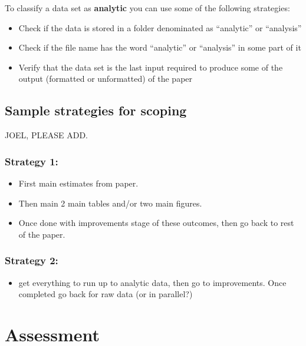\documentclass[]{book}
\providecommand{\tightlist}{%
  \setlength{\itemsep}{0pt}\setlength{\parskip}{0pt}}
\begin{document}
To classify a data set as \textbf{analytic} you can use some of the following strategies:

\begin{itemize}
\tightlist
\item
  Check if the data is stored in a folder denominated as ``analytic'' or ``analysis''\\
\item
  Check if the file name has the word ``analytic'' or ``analysis'' in some part of it\\
\item
  Verify that the data set is the last input required to produce some of the output (formatted or unformatted) of the paper
\end{itemize}

\hypertarget{sample-strategies-for-scoping}{%
\section{Sample strategies for scoping}\label{sample-strategies-for-scoping}}

JOEL, PLEASE ADD.

\hypertarget{strategy-1}{%
\subsection{Strategy 1:}\label{strategy-1}}

\begin{itemize}
\item
  First main estimates from paper.
\item
  Then main 2 main tables and/or two main figures.
\item
  Once done with improvements stage of these outcomes, then go back to rest of the paper.
\end{itemize}

\hypertarget{strategy-2}{%
\subsection{Strategy 2:}\label{strategy-2}}

\begin{itemize}
\tightlist
\item
  get everything to run up to analytic data, then go to improvements. Once completed go back for raw data (or in parallel?)
\end{itemize}

\hypertarget{assessment}{%
\chapter{Assessment}\label{assessment}}
\end{document}
